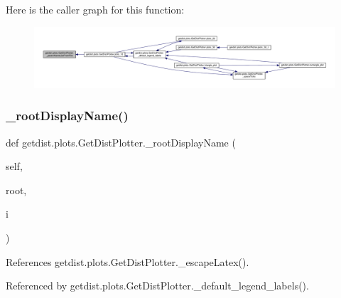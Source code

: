 Here is the caller graph for this function\+:
\nopagebreak
\begin{figure}[H]
\begin{center}
\leavevmode
\includegraphics[width=350pt]{classgetdist_1_1plots_1_1GetDistPlotter_a63da566e8c3acdfff3865ae29e73ba4d_icgraph}
\end{center}
\end{figure}
\mbox{\label{classgetdist_1_1plots_1_1GetDistPlotter_ad7bb533b92ff93733da80a76c65ae47e}} 
\subsubsection{\texorpdfstring{\+\_\+root\+Display\+Name()}{\_rootDisplayName()}}
{\footnotesize\ttfamily def getdist.\+plots.\+Get\+Dist\+Plotter.\+\_\+root\+Display\+Name (\begin{DoxyParamCaption}\item[{}]{self,  }\item[{}]{root,  }\item[{}]{i }\end{DoxyParamCaption})\hspace{0.3cm}{\ttfamily [private]}}



References getdist.\+plots.\+Get\+Dist\+Plotter.\+\_\+escape\+Latex().



Referenced by getdist.\+plots.\+Get\+Dist\+Plotter.\+\_\+default\+\_\+legend\+\_\+labels().

